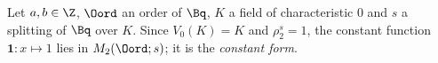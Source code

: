 Let $a,b\in\Z$, $\Oord$ an order of $\Bq$, $K$ a field of characteristic $0$ and $s$ a splitting of $\Bq$ over $K$. Since
$V_0(K)=K$ and $\rho_2^s=1$, the constant function $\mathbf 1\colon x\mapsto1$ lies in $M_2(\Oord;s)$; it is the \emph{constant form}.
